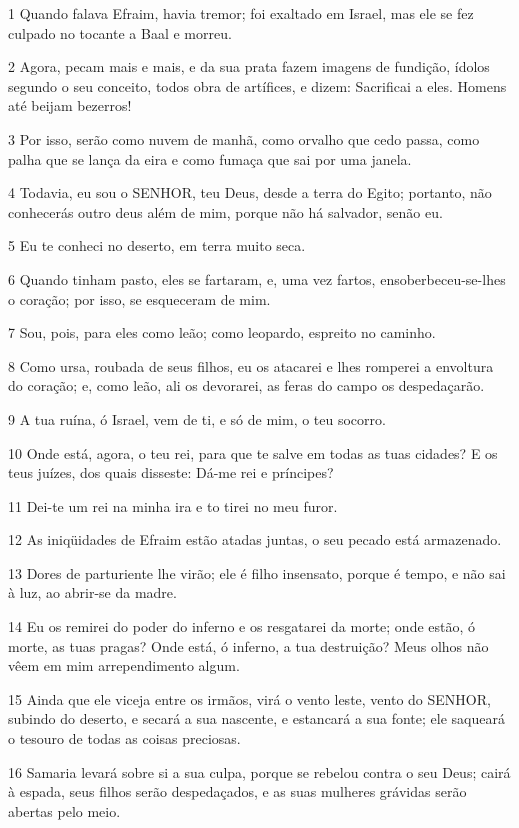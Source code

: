 \par 1 Quando falava Efraim, havia tremor; foi exaltado em Israel, mas ele se fez culpado no tocante a Baal e morreu.
\par 2 Agora, pecam mais e mais, e da sua prata fazem imagens de fundição, ídolos segundo o seu conceito, todos obra de artífices, e dizem: Sacrificai a eles. Homens até beijam bezerros!
\par 3 Por isso, serão como nuvem de manhã, como orvalho que cedo passa, como palha que se lança da eira e como fumaça que sai por uma janela.
\par 4 Todavia, eu sou o SENHOR, teu Deus, desde a terra do Egito; portanto, não conhecerás outro deus além de mim, porque não há salvador, senão eu.
\par 5 Eu te conheci no deserto, em terra muito seca.
\par 6 Quando tinham pasto, eles se fartaram, e, uma vez fartos, ensoberbeceu-se-lhes o coração; por isso, se esqueceram de mim.
\par 7 Sou, pois, para eles como leão; como leopardo, espreito no caminho.
\par 8 Como ursa, roubada de seus filhos, eu os atacarei e lhes romperei a envoltura do coração; e, como leão, ali os devorarei, as feras do campo os despedaçarão.
\par 9 A tua ruína, ó Israel, vem de ti, e só de mim, o teu socorro.
\par 10 Onde está, agora, o teu rei, para que te salve em todas as tuas cidades? E os teus juízes, dos quais disseste: Dá-me rei e príncipes?
\par 11 Dei-te um rei na minha ira e to tirei no meu furor.
\par 12 As iniqüidades de Efraim estão atadas juntas, o seu pecado está armazenado.
\par 13 Dores de parturiente lhe virão; ele é filho insensato, porque é tempo, e não sai à luz, ao abrir-se da madre.
\par 14 Eu os remirei do poder do inferno e os resgatarei da morte; onde estão, ó morte, as tuas pragas? Onde está, ó inferno, a tua destruição? Meus olhos não vêem em mim arrependimento algum.
\par 15 Ainda que ele viceja entre os irmãos, virá o vento leste, vento do SENHOR, subindo do deserto, e secará a sua nascente, e estancará a sua fonte; ele saqueará o tesouro de todas as coisas preciosas.
\par 16 Samaria levará sobre si a sua culpa, porque se rebelou contra o seu Deus; cairá à espada, seus filhos serão despedaçados, e as suas mulheres grávidas serão abertas pelo meio.

